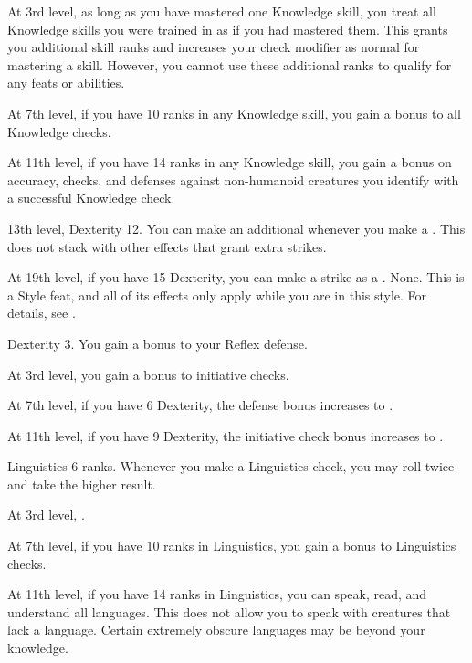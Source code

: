     At 3rd level, as long as you have mastered one Knowledge skill, you treat all Knowledge skills you were trained in as if you had mastered them.
    This grants you additional skill ranks and increases your check modifier as normal for mastering a skill.
    However, you cannot use these additional ranks to qualify for any feats or abilities.

    At 7th level, if you have 10 ranks in any Knowledge skill, you gain a  bonus to all Knowledge checks.

    At 11th level, if you have 14 ranks in any Knowledge skill, you gain a  bonus on accuracy, checks, and defenses against non-humanoid creatures you identify with a successful Knowledge check.

    \featpres 13th level, Dexterity 12.
    \featben You can make an additional  whenever you make a  .
    This does not stack with other effects that grant extra strikes.

    At 19th level, if you have 15 Dexterity, you can make a strike as a .
    \stylereq None.
     This is a Style feat, and all of its effects only apply while you are in this style.
    For details, see .

    \featpre Dexterity 3.
    \featben You gain a  bonus to your Reflex defense.

    At 3rd level, you gain a  bonus to initiative checks.

    At 7th level, if you have 6 Dexterity, the defense bonus increases to .

    At 11th level, if you have 9 Dexterity, the initiative check bonus increases to .

    \featpre Linguistics 6 ranks.
    \featben Whenever you make a Linguistics check, you may roll twice and take the higher result.

    At 3rd level, \tdash.

    At 7th level, if you have 10 ranks in Linguistics, you gain a  bonus to Linguistics checks.

    At 11th level, if you have 14 ranks in Linguistics, you can speak, read, and understand all languages.
    This does not allow you to speak with creatures that lack a language.
    Certain extremely obscure languages may be beyond your knowledge.

